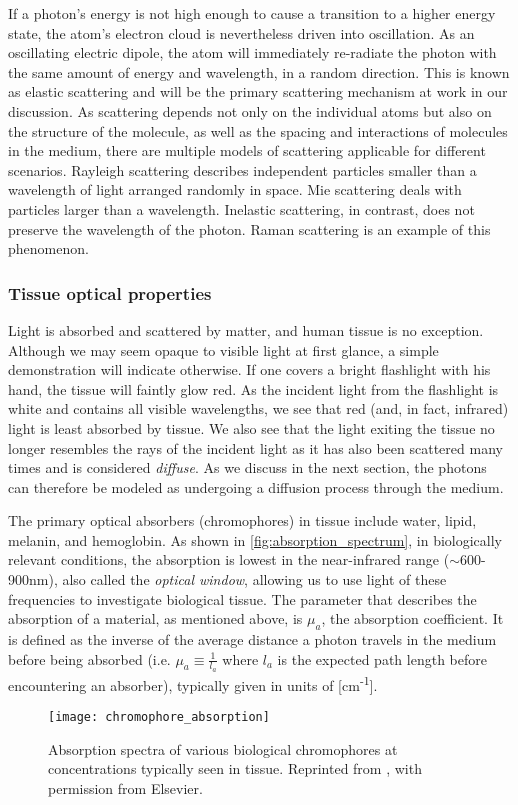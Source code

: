 If a photon's energy is not high enough to cause a transition to a higher energy state, the atom's electron cloud is nevertheless driven into oscillation. As an oscillating electric dipole, the atom will immediately re-radiate the photon with the same amount of energy and wavelength, in a random direction. This is known as elastic scattering and will be the primary scattering mechanism at work in our discussion. As scattering depends not only on the individual atoms but also on the structure of the molecule, as well as the spacing and interactions of molecules in the medium, there are multiple models of scattering applicable for different scenarios.  Rayleigh scattering describes independent particles smaller than a wavelength of light arranged randomly in space. Mie scattering deals with particles larger than a wavelength. Inelastic scattering, in contrast, does not preserve the wavelength of the photon. Raman scattering is an example of this phenomenon.


\subsubsection{Tissue optical properties}
Light is absorbed and scattered by matter, and human tissue is no exception. Although we may seem opaque to visible light at first glance, a simple demonstration will indicate otherwise. If one covers a bright flashlight with his hand, the tissue will faintly glow red. As the incident light from the flashlight is white and contains all visible wavelengths, we see that red (and, in fact, infrared) light is least absorbed by tissue. We also see that the light exiting the tissue no longer resembles the rays of the incident light as it has also been scattered many times and is considered \emph{diffuse}. As we discuss in the next section, the photons can therefore be modeled as undergoing a diffusion process through the medium.

The primary optical absorbers (chromophores) in tissue include water, lipid, melanin, and hemoglobin. As shown in \autoref{fig:absorption_spectrum}, in biologically relevant conditions, the absorption is lowest in the near-infrared range ($\sim$600-900nm), also called the \emph{optical window}, allowing us to use light of these frequencies to investigate biological tissue. The parameter that describes the absorption of a material, as mentioned above, is $\mu_a$, the absorption coefficient. It is defined as the inverse of the average distance a photon travels in the medium before being absorbed (i.e. $\mu_a \equiv \frac{1}{l_a}$ where $l_a$ is the expected path length before encountering an absorber), typically given in units of [cm\textsuperscript{-1}]. 
\begin{figure}[tb]
    \centering
    \texttt{[image: chromophore\_absorption]}
    \caption{Absorption spectra of various biological chromophores at concentrations typically seen in tissue. Reprinted from \cite{Scholkmann2013}, with permission from Elsevier.}
    \label{fig:absorption_spectrum}
\end{figure}

